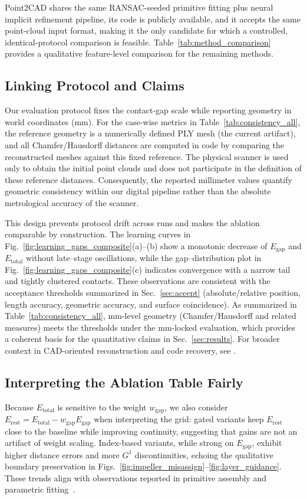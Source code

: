 \documentclass{ieeeaccess}
\begin{document}
Point2CAD shares the same RANSAC-seeded primitive fitting plus neural
implicit refinement pipeline, its code is publicly available, and it
accepts the same point-cloud input format, making it the only candidate
for which a controlled, identical-protocol comparison is feasible.
Table~\ref{tab:method_comparison} provides a qualitative
feature-level comparison for the remaining methods.

\subsection{Linking Protocol and Claims}
Our evaluation protocol fixes the contact-gap scale while reporting geometry in world coordinates (mm).
For the case-wise metrics in Table~\ref{tab:consistency_all}, the reference geometry is a numerically defined PLY mesh (the current artifact), and all Chamfer/Hausdorff distances are computed in code by comparing the reconstructed meshes against this fixed reference.
The physical scanner is used only to obtain the initial point clouds and does not participate in the definition of these reference distances.
Consequently, the reported millimeter values quantify geometric consistency within our digital pipeline rather than the absolute metrological accuracy of the scanner.

This design prevents protocol drift across runs and makes the ablation
comparable by construction. The learning curves in
Fig.~\ref{fig:learning_gaps_composite}(a)–(b) show a monotonic decrease of
$E_{\text{gap}}$ and $E_{\text{total}}$ without late–stage oscillations,
while the gap–distribution plot in Fig.~\ref{fig:learning_gaps_composite}(c)
indicates convergence with a narrow tail and tightly clustered contacts.
These observations are consistent with the acceptance thresholds summarized in Sec.~\ref{sec:accept}
(absolute/relative position, length accuracy, geometric accuracy, and surface coincidence).
As summarized in Table~\ref{tab:consistency_all}, mm-level geometry (Chamfer/Hausdorff and related measures) meets the thresholds
under the mm-locked evaluation, which provides a coherent basis for the quantitative claims in Sec.~\ref{sec:results}.
For broader context in CAD-oriented reconstruction and code recovery, see \cite{b2,b24}.


\subsection{Interpreting the Ablation Table Fairly}
Because $E_{\text{total}}$ is sensitive to the weight $w_{\text{gap}}$, we also consider
$E_{\text{rest}}=E_{\text{total}}-w_{\text{gap}}E_{\text{gap}}$ when interpreting the grid: gated
variants keep $E_{\text{rest}}$ close to the baseline while improving continuity,
suggesting that gains are not an artifact of weight scaling.
Index-based variants, while strong on $E_{\text{gap}}$, exhibit higher
distance errors and more $G^1$ discontinuities, echoing the
qualitative boundary preservation in Figs.~\ref{fig:impeller_misassign}--\ref{fig:layer_guidance}. These trends align with observations reported in primitive assembly and parametric fitting~\cite{b14,b19}.
\end{document}
